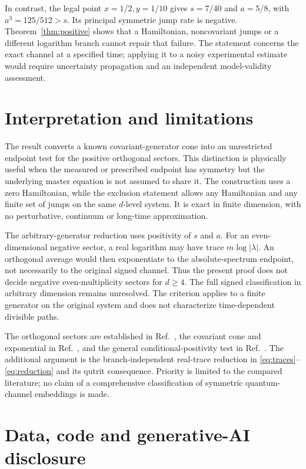 \documentclass[11pt]{article}
\begin{document}
In contrast, the legal point $x=1/2,y=1/10$ gives
$s=7/40$ and $a=5/8$, with
$a^3=125/512>s$. Its principal symmetric jump rate is negative.
Theorem~\ref{thm:positive} shows that a Hamiltonian, noncovariant jumps
or a different logarithm branch cannot repair that failure.
The statement concerns the exact channel at a specified time; applying it
to a noisy experimental estimate would require uncertainty propagation
and an independent model-validity assessment.

\section{Interpretation and limitations}

The result converts a known covariant-generator cone into an unrestricted
endpoint test for the positive orthogonal sectors. This distinction is
physically useful when the measured or prescribed endpoint has symmetry but
the underlying master equation is not assumed to share it. The construction
uses a zero Hamiltonian, while the exclusion statement allows any
Hamiltonian and any finite set of jumps on the same $d$-level system.
It is exact in finite dimension, with no perturbative, continuum or
long-time approximation.

The arbitrary-generator reduction uses positivity of $s$ and $a$.
For an even-dimensional negative sector, a real logarithm may have trace
$m\log|\lambda|$. An orthogonal average would then exponentiate to the
absolute-spectrum endpoint, not necessarily to the original signed
channel. Thus the present proof does not decide negative
even-multiplicity sectors for $d\geq4$. The full signed classification
in arbitrary dimension remains unresolved. The criterion applies to a finite
generator on the original system and does not characterize time-dependent
divisible paths.

The orthogonal sectors are established in Ref.~\cite{Hashagen2018}, the
covariant cone and exponential in Ref.~\cite{Bhat2023}, and the general
conditional-positivity test in Ref.~\cite{Wolf2008}. The additional argument
is the branch-independent real-trace reduction in
\eqref{eq:traces}--\eqref{eq:reduction} and its qutrit consequence.
Priority is limited to the compared literature; no claim of a comprehensive
classification of symmetric quantum-channel embeddings is made.

\clearpage
\section*{Data, code and generative-AI disclosure}
\end{document}
